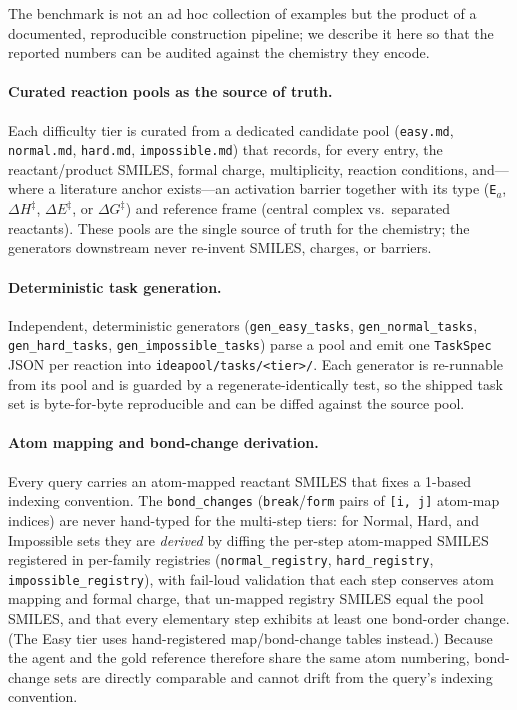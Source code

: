 \documentclass[10pt,twocolumn,letterpaper]{article}
\begin{document}
The benchmark is not an ad hoc collection of examples but the product of a documented, reproducible construction pipeline; we describe it here so that the reported numbers can be audited against the chemistry they encode.

\paragraph{Curated reaction pools as the source of truth.}
Each difficulty tier is curated from a dedicated candidate pool (\texttt{easy.md}, \texttt{normal.md}, \texttt{hard.md}, \texttt{impossible.md}) that records, for every entry, the reactant/product SMILES, formal charge, multiplicity, reaction conditions, and---where a literature anchor exists---an activation barrier together with its type (\texttt{E$_a$}, \texttt{$\Delta H^\ddagger$}, \texttt{$\Delta E^\ddagger$}, or \texttt{$\Delta G^\ddagger$}) and reference frame (central complex vs.\ separated reactants). These pools are the single source of truth for the chemistry; the generators downstream never re-invent SMILES, charges, or barriers.

\paragraph{Deterministic task generation.}
Independent, deterministic generators (\texttt{gen\_easy\_tasks}, \texttt{gen\_normal\_tasks}, \texttt{gen\_hard\_tasks}, \texttt{gen\_impossible\_tasks}) parse a pool and emit one \texttt{TaskSpec} JSON per reaction into \texttt{ideapool/tasks/<tier>/}. Each generator is re-runnable from its pool and is guarded by a regenerate-identically test, so the shipped task set is byte-for-byte reproducible and can be diffed against the source pool.

\paragraph{Atom mapping and bond-change derivation.}
Every query carries an atom-mapped reactant SMILES that fixes a 1-based indexing convention. The \texttt{bond\_changes} (\texttt{break}/\texttt{form} pairs of \texttt{[i, j]} atom-map indices) are never hand-typed for the multi-step tiers: for Normal, Hard, and Impossible sets they are \emph{derived} by diffing the per-step atom-mapped SMILES registered in per-family registries (\texttt{normal\_registry}, \texttt{hard\_registry}, \texttt{impossible\_registry}), with fail-loud validation that each step conserves atom mapping and formal charge, that un-mapped registry SMILES equal the pool SMILES, and that every elementary step exhibits at least one bond-order change. (The Easy tier uses hand-registered map/bond-change tables instead.) Because the agent and the gold reference therefore share the same atom numbering, bond-change sets are directly comparable and cannot drift from the query's indexing convention.
\end{document}

